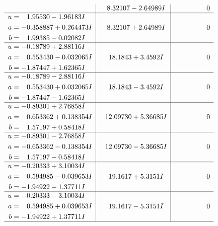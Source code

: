 \documentclass[1p]{elsarticle_modified}
\theoremstyle{definition}
\begin{document}
$$\begin{array}{c|c|c}
 & \phantom{-}8.32107 - 2.64989 I & \phantom{-0.000000 } 0 \\ \hline\begin{aligned}
u &= \phantom{-}1.95530 - 1.96183 I \\
a &= -0.358887 + 0.264473 I \\
b &= \phantom{-}1.99385 - 0.02082 I\end{aligned}
 & \phantom{-}8.32107 + 2.64989 I & \phantom{-0.000000 } 0 \\ \hline\begin{aligned}
u &= -0.18789 + 2.88116 I \\
a &= \phantom{-}0.553430 - 0.032065 I \\
b &= -1.87447 + 1.62365 I\end{aligned}
 & \phantom{-}18.1843 + 3.4592 I & \phantom{-0.000000 } 0 \\ \hline\begin{aligned}
u &= -0.18789 - 2.88116 I \\
a &= \phantom{-}0.553430 + 0.032065 I \\
b &= -1.87447 - 1.62365 I\end{aligned}
 & \phantom{-}18.1843 - 3.4592 I & \phantom{-0.000000 } 0 \\ \hline\begin{aligned}
u &= -0.89301 + 2.76858 I \\
a &= -0.653362 + 0.138354 I \\
b &= \phantom{-}1.57197 + 0.58418 I\end{aligned}
 & \phantom{-}12.09730 + 5.36685 I & \phantom{-0.000000 } 0 \\ \hline\begin{aligned}
u &= -0.89301 - 2.76858 I \\
a &= -0.653362 - 0.138354 I \\
b &= \phantom{-}1.57197 - 0.58418 I\end{aligned}
 & \phantom{-}12.09730 - 5.36685 I & \phantom{-0.000000 } 0 \\ \hline\begin{aligned}
u &= -0.20333 + 3.10034 I \\
a &= \phantom{-}0.594985 - 0.039653 I \\
b &= -1.94922 - 1.37711 I\end{aligned}
 & \phantom{-}19.1617 + 5.3151 I & \phantom{-0.000000 } 0 \\ \hline\begin{aligned}
u &= -0.20333 - 3.10034 I \\
a &= \phantom{-}0.594985 + 0.039653 I \\
b &= -1.94922 + 1.37711 I\end{aligned}
 & \phantom{-}19.1617 - 5.3151 I & \phantom{-0.000000 } 0\\
 \hline 
 \end{array}$$\newpage\newpage\renewcommand{\arraystretch}{1}
\end{document}
